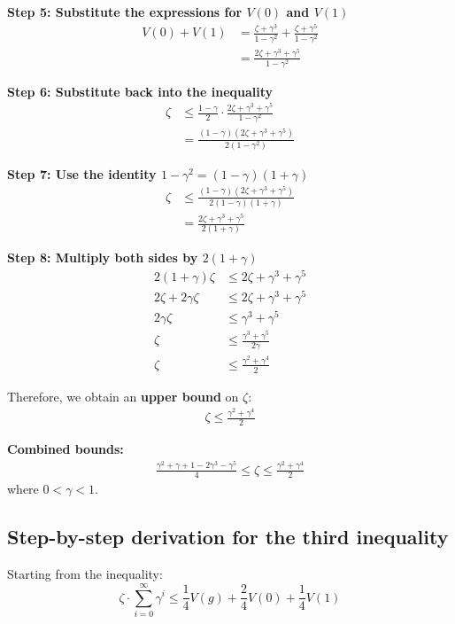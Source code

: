 \textbf{Step 5: Substitute the expressions for $V(0)$ and $V(1)$}
\begin{align}
V(0) + V(1) &= \frac{\zeta + \gamma^3}{1-\gamma^2} + \frac{\zeta + \gamma^5}{1-\gamma^2}\\
&= \frac{2\zeta + \gamma^3 + \gamma^5}{1-\gamma^2}
\end{align}

\textbf{Step 6: Substitute back into the inequality}
\begin{align}
\zeta &\leq \frac{1-\gamma}{2} \cdot \frac{2\zeta + \gamma^3 + \gamma^5}{1-\gamma^2}\\
&= \frac{(1-\gamma)(2\zeta + \gamma^3 + \gamma^5)}{2(1-\gamma^2)}
\end{align}

\textbf{Step 7: Use the identity $1-\gamma^2 = (1-\gamma)(1+\gamma)$}
\begin{align}
\zeta &\leq \frac{(1-\gamma)(2\zeta + \gamma^3 + \gamma^5)}{2(1-\gamma)(1+\gamma)}\\
&= \frac{2\zeta + \gamma^3 + \gamma^5}{2(1+\gamma)}
\end{align}

\textbf{Step 8: Multiply both sides by $2(1+\gamma)$}
\begin{align}
2(1+\gamma)\zeta &\leq 2\zeta + \gamma^3 + \gamma^5\\
2\zeta + 2\gamma\zeta &\leq 2\zeta + \gamma^3 + \gamma^5\\
2\gamma\zeta &\leq \gamma^3 + \gamma^5\\
\zeta &\leq \frac{\gamma^3 + \gamma^5}{2\gamma}\\
\zeta &\leq \frac{\gamma^2 + \gamma^4}{2}
\end{align}

Therefore, we obtain an \textbf{upper bound} on $\zeta$:
\begin{align}
\zeta \leq \frac{\gamma^2 + \gamma^4}{2}
\end{align}

\textbf{Combined bounds:}
\begin{align}
\frac{\gamma^2 + \gamma + 1 - 2\gamma^3 - \gamma^5}{4} \leq \zeta \leq \frac{\gamma^2 + \gamma^4}{2}
\end{align}
where $0 < \gamma < 1$.

\subsection{Step-by-step derivation for the third inequality}

Starting from the inequality:
$$\zeta\cdot\sum_{i=0}^\infty \gamma^i \leq \frac{1}{4}V(g) + \frac{2}{4}V(0) + \frac{1}{4}V(1)$$

